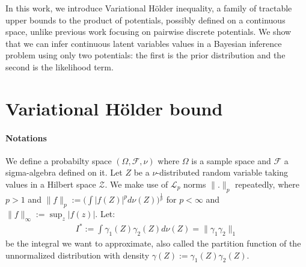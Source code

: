 \documentclass{article} %
\newcommand{\Holder}{H\"older\xspace}
\newcommand{\Zspace}{\mathcal{Z}}
\newcommand{\f}{f}
\newcommand{\red}[1]{{\color{red}#1}}
\newcommand{\LSE}[3]{\bar{\mathbb{E}}_{#1}^{#2}\left[#3\right]}
\newcommand{\Expectation}[2]{\int{#2}d\nu(\Z)}
\def\Z{Z}
\begin{document}
In this work, we introduce Variational \Holder inequality, a family of tractable upper bounds to the product
of potentials, possibly defined on a continuous space, unlike previous work focusing on pairwise discrete potentials. 
We show that we can infer continuous latent variables values in a Bayesian inference problem using only two potentials: 
the first  is the prior distribution and the second is the likelihood term. 





\section{Variational \Holder bound}
\label{sec:vh}


\paragraph{Notations}

We define a probabilty space $(\Omega,\mathcal{F}, \nu)$ where $\Omega$ 
is a sample space and $\mathcal{F}$ a sigma-algebra defined on it.
Let $\Z$ be a $\nu$-distributed random variable taking values in a Hilbert space $\Zspace$.
We make use of $\mathcal{L}_p$ norms $\|.\|_p$ repeatedly, where $p>1$ and
$\|\f\|_p:=\bigl(\Expectation{\nu}{|f(\Z)|^p}\bigr)^{\frac 1p}$ for $p<\infty$ and $\|\f\|_\infty:=\sup_z |f(z)|$.
Let: %
\begin{eqnarray}
I^*:=\Expectation{}{\gamma_1(\Z)\gamma_2(\Z)}=\|\gamma_1\gamma_2\|_1
\end{eqnarray}
be the integral we want to approximate, also 
called the partition function of the unnormalized distribution with density $\gamma(\Z) :=\gamma_1(\Z)\gamma_2(\Z)$.
\end{document}
